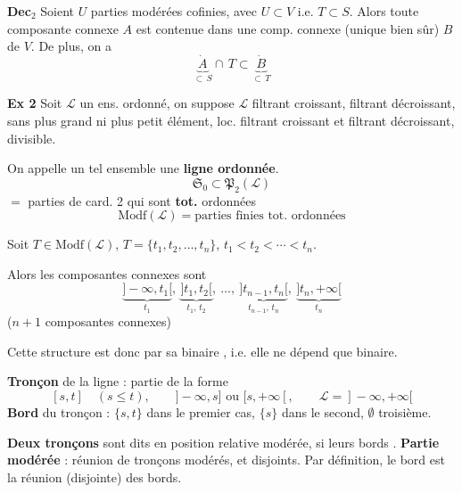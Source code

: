 \documentclass[11pt,a4paper]{article}
\begin{document}
\textbf{Dec$_2$} Soient $U$  parties modérées cofinies, avec $U \subset V$ i.e. $T \subset S$. Alors toute composante connexe $A$  est contenue dans une comp. connexe (unique bien sûr) $B$ de $V$. De plus, on a
\[
  \underbrace{\dot{A}}_{\subset\, S} \cap\, T \subset \underbrace{\dot{B}}_{\subset\, T}
\]

\textbf{Ex 2} Soit \struck{\ill{}} $\mathcal{L}$ un ens. ordonné, on suppose $\mathcal{L}$ filtrant croissant, filtrant décroissant, sans plus grand ni plus petit élément, loc. filtrant croissant et filtrant décroissant, divisible.

On appelle un tel ensemble une \textbf{ligne ordonnée}.
\[
  \mathfrak{S}_0 \subset \mathfrak{P}_2(\mathcal{L})
\]
 $=$ parties  de card. 2 qui sont \textbf{tot.} ordonnées
\[
  \mathrm{Modf}(\mathcal{L}) = \text{parties finies tot. ordonnées}
\]

Soit $T \in \mathrm{Modf}(\mathcal{L})$, $T = \{t_1, t_2, \ldots, t_n\}$, $t_1 < t_2 < \cdots < t_n$.

Alors les composantes connexes sont
\[
  \underbrace{]-\infty, t_1[}_{t_1},\ \underbrace{]t_1, t_2[}_{t_1,\, t_2},\ \ldots,\ \underbrace{]t_{n-1}, t_n[}_{t_{n-1},\, t_n},\ \underbrace{]t_n, +\infty[}_{t_n}
\]
($n+1$ composantes connexes)

Cette structure est donc  par sa \struck{\ill{}}  binaire  \ill{}, i.e. elle ne dépend que  binaire.


\struck{\ill{}}

\textbf{Tronçon} de la ligne : partie de la forme
\[
  [s,t] \quad (s \leq t), \qquad ]-\infty, s] \text{ ou } [s, +\infty[, \qquad \mathcal{L} = ]-\infty, +\infty[
\]
\textbf{Bord} du tronçon : $\{s,t\}$ dans le premier cas, $\{s\}$ dans le second, $\emptyset$  troisième.


\textbf{Deux tronçons} sont dits en position relative modérée, si leurs bords \ill{}. \textbf{Partie modérée} : réunion  de tronçons  modérés, et disjoints.  Par définition, le bord est la réunion (disjointe) des bords.
\end{document}
